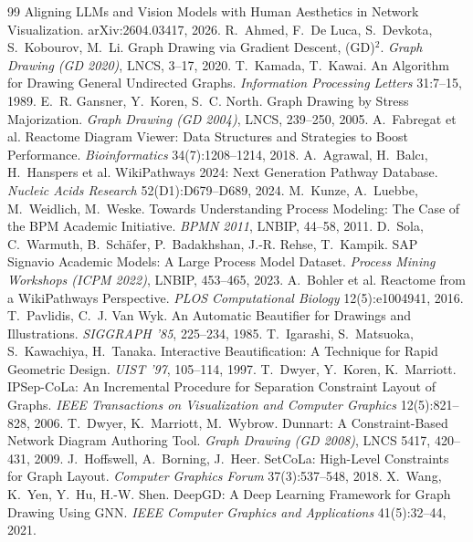 \documentclass[a4paper,UKenglish]{gd-lipics-v3}
\begin{document}
\begin{thebibliography}{99}
 Aligning LLMs and Vision Models with Human Aesthetics in Network Visualization.
 arXiv:2604.03417, 2026.
 R.~Ahmed, F.~De Luca, S.~Devkota, S.~Kobourov, M.~Li. Graph Drawing via
 Gradient Descent, (GD)$^2$. \emph{Graph Drawing (GD 2020)}, LNCS, 3--17, 2020.
 T.~Kamada, T.~Kawai. An Algorithm for Drawing General Undirected Graphs.
 \emph{Information Processing Letters} 31:7--15, 1989.
 E.~R. Gansner, Y.~Koren, S.~C. North. Graph Drawing by Stress
 Majorization. \emph{Graph Drawing (GD 2004)}, LNCS, 239--250, 2005.
 A.~Fabregat et al. Reactome Diagram Viewer: Data Structures and
 Strategies to Boost Performance. \emph{Bioinformatics} 34(7):1208--1214, 2018.
 A.~Agrawal, H.~Balc\i, H.~Hanspers et al. WikiPathways 2024: Next
 Generation Pathway Database. \emph{Nucleic Acids Research} 52(D1):D679--D689, 2024.
 M.~Kunze, A.~Luebbe, M.~Weidlich, M.~Weske. Towards Understanding
 Process Modeling: The Case of the BPM Academic Initiative. \emph{BPMN 2011}, LNBIP,
 44--58, 2011.
 D.~Sola, C.~Warmuth, B.~Sch\"afer, P.~Badakhshan, J.-R. Rehse, T.~Kampik.
 SAP Signavio Academic Models: A Large Process Model Dataset. \emph{Process Mining
 Workshops (ICPM 2022)}, LNBIP, 453--465, 2023.
 A.~Bohler et al. Reactome from a WikiPathways Perspective. \emph{PLOS
 Computational Biology} 12(5):e1004941, 2016.
 T.~Pavlidis, C.~J. Van Wyk. An Automatic Beautifier for Drawings and
 Illustrations. \emph{SIGGRAPH '85}, 225--234, 1985.
 T.~Igarashi, S.~Matsuoka, S.~Kawachiya, H.~Tanaka. Interactive
 Beautification: A Technique for Rapid Geometric Design. \emph{UIST '97}, 105--114, 1997.
 T.~Dwyer, Y.~Koren, K.~Marriott. IPSep-CoLa: An Incremental
 Procedure for Separation Constraint Layout of Graphs. \emph{IEEE Transactions on
 Visualization and Computer Graphics} 12(5):821--828, 2006.
 T.~Dwyer, K.~Marriott, M.~Wybrow. Dunnart: A Constraint-Based Network
 Diagram Authoring Tool. \emph{Graph Drawing (GD 2008)}, LNCS 5417, 420--431, 2009.
 J.~Hoffswell, A.~Borning, J.~Heer. SetCoLa: High-Level Constraints
 for Graph Layout. \emph{Computer Graphics Forum} 37(3):537--548, 2018.
 X.~Wang, K.~Yen, Y.~Hu, H.-W. Shen. DeepGD: A Deep Learning Framework
 for Graph Drawing Using GNN. \emph{IEEE Computer Graphics and Applications}
 41(5):32--44, 2021.
\end{thebibliography}
\end{document}
